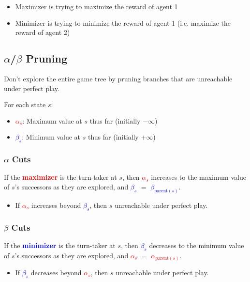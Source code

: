 \begin{warning}
    \begin{itemize}
        \item Maximizer is trying to maximize the reward of agent 1
        \item Minimizer is trying to minimize the reward of agent 1 (i.e. maximize the reward of agent 2)
    \end{itemize}
\end{warning}
\newpage

\subsection{$\alpha$/$\beta$ Pruning}
\begin{motivation}
    Don't explore the entire game tree by pruning branches that are unreachable under perfect play.
\end{motivation}
\begin{definition}
    For each state $s$: 
    \begin{itemize}
        \item \textcolor{red}{$\alpha_s$}: Maximum value at $s$ thus far (initially $-\infty$)
        \item \textcolor{blue}{$\beta_s$}: Minimum value at $s$ thus far (initially $+\infty$)
    \end{itemize}
\end{definition}

\subsubsection{$\alpha$ Cuts}
\begin{definition}
    If the \textcolor{red}{\textbf{maximizer}} is the turn-taker at $s$, then \textcolor{red}{$\alpha_s$} increases to the maximum value of $s$'s successors as they are explored, and \textcolor{blue}{$\beta_s$} $=$ \textcolor{blue}{$\beta_{\text{parent}(s)}$}.
    \begin{itemize}
        \item If \textcolor{red}{$\alpha_s$} increases beyond \textcolor{blue}{$\beta_s$}, then $s$ unreachable under perfect play.
    \end{itemize}
\end{definition}

\subsubsection{$\beta$ Cuts}
\begin{definition}
    If the \textcolor{blue}{\textbf{minimizer}} is the turn-taker at $s$, then \textcolor{blue}{$\beta_s$} decreases to the minimum value of $s$'s successors as they are explored, and \textcolor{red}{$\alpha_s$} $=$ \textcolor{red}{$\alpha_{\text{parent}(s)}$}.
    \begin{itemize}
        \item If \textcolor{blue}{$\beta_s$} decreases beyond \textcolor{red}{$\alpha_s$}, then $s$ unreachable under perfect play. 
    \end{itemize}
\end{definition}
\newpage


